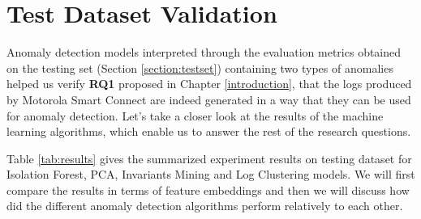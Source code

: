 \section{Test Dataset Validation}

Anomaly detection models interpreted through the evaluation metrics obtained on the testing set (Section \ref{section:testset}) containing two types of anomalies helped us verify \textbf{RQ1} proposed in Chapter \ref{introduction}, that the logs produced by Motorola Smart Connect are indeed generated in a way that they can be used for anomaly detection. Let's take a closer look at the results of the machine learning algorithms, which enable us to answer the rest of the research questions.

Table \ref{tab:results} gives the summarized experiment results on testing dataset for Isolation Forest, PCA, Invariants Mining and Log Clustering models. We will first compare the results in terms of feature embeddings and then we will discuss how did the different anomaly detection algorithms perform relatively to each other. 

